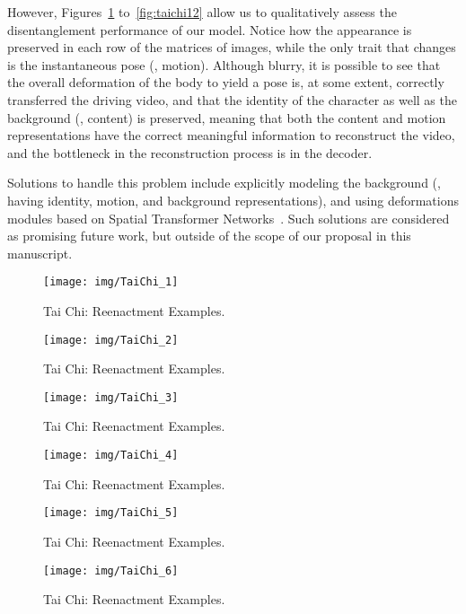 However, Figures~\ref{fig:taichi1} to~\ref{fig:taichi12} allow us to qualitatively assess the disentanglement performance of our model.
Notice how the appearance is preserved in each row of the matrices of images, while the only trait that changes is the instantaneous pose (\ie, motion).
Although blurry, it is possible to see that the overall deformation of the body to yield a pose is, at some extent, correctly transferred \wrt the driving video, and that the identity of the character as well as the background (\ie, content) is preserved, meaning that both the content and motion representations have the correct meaningful information to reconstruct the video, and the bottleneck in the reconstruction process is in the decoder.

Solutions to handle this problem include explicitly modeling the background (\ie, having identity, motion, and background representations), and using deformations modules based on Spatial Transformer Networks~\cite{Jaderberg2015}.
Such solutions are considered as promising future work, but outside of the scope of our proposal in this manuscript.


\begin{figure}
\centering
\texttt{[image: img/TaiChi\_1]}
\caption{Tai Chi: Reenactment Examples.}
\label{fig:taichi1}
\end{figure}

\begin{figure}
\centering
\texttt{[image: img/TaiChi\_2]}
\caption{Tai Chi: Reenactment Examples.}
\label{fig:taichi2}
\end{figure}

\begin{figure}
\centering
\texttt{[image: img/TaiChi\_3]}
\caption{Tai Chi: Reenactment Examples.}
\label{fig:taichi3}
\end{figure}

\begin{figure}
\centering
\texttt{[image: img/TaiChi\_4]}
\caption{Tai Chi: Reenactment Examples.}
\label{fig:taichi4}
\end{figure}

\begin{figure}
\centering
\texttt{[image: img/TaiChi\_5]}
\caption{Tai Chi: Reenactment Examples.}
\label{fig:taichi5}
\end{figure}

\begin{figure}
\centering
\texttt{[image: img/TaiChi\_6]}
\caption{Tai Chi: Reenactment Examples.}
\label{fig:taichi6}
\end{figure}

